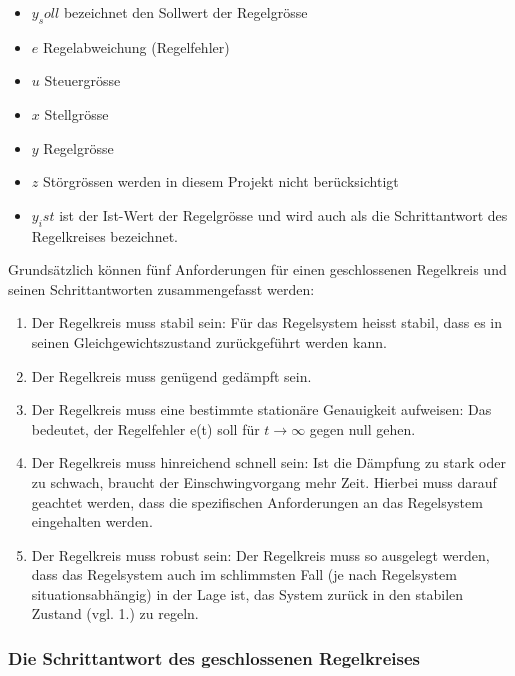 \begin{itemize}
    \item
        $y_soll$ bezeichnet den Sollwert der Regelgr\"osse
    \item
        $e$ Regelabweichung (Regelfehler)
    \item
        $u$ Steuergr\"osse
    \item
        $x$ Stellgr\"osse
    \item
        $y$ Regelgr\"osse
    \item
        $z$ St\"orgr\"ossen werden in diesem Projekt nicht ber\"ucksichtigt
    \item
        $y_ist$  ist der  Ist-Wert der  Regelgr\"osse  und wird  auch als  die
        Schrittantwort des Regelkreises bezeichnet.
\end{itemize}


Grunds\"atzlich  k\"onnen  f\"unf   Anforderungen  f\"ur  einen  geschlossenen
Regelkreis und seinen Schrittantworten zusammengefasst werden:
\begin{enumerate}
    \item
        Der Regelkreis muss stabil  sein: F\"ur das Regelsystem heisst stabil,
        dass es in seinen Gleichgewichtszustand zur\"uckgef\"uhrt werden kann.
    \item
        Der Regelkreis muss gen\"ugend ged\"ampft sein.
    \item
        Der   Regelkreis   muss   eine  bestimmte   station\"are   Genauigkeit
        aufweisen: Das   bedeutet,    der   Regelfehler   e(t)    soll   f\"ur
        $t\rightarrow\infty$ gegen null gehen.
    \item
        Der  Regelkreis  muss  hinreichend schnell  sein: Ist  die  D\"ampfung
        zu  stark   oder  zu  schwach,  braucht   der  Einschwingvorgang  mehr
        Zeit. Hierbei  muss  darauf  geachtet werden,  dass  die  spezifischen
        Anforderungen an das Regelsystem eingehalten werden.
    \item
        Der  Regelkreis muss  robust  sein: Der Regelkreis  muss so  ausgelegt
        werden,  dass  das  Regelsystem  auch im  schlimmsten  Fall  (je  nach
        Regelsystem situationsabh\"angig) in der Lage ist, das System zur\"uck
        in den stabilen Zustand (vgl. 1.) zu regeln.
\end{enumerate}


\subsubsection*{Die Schrittantwort des geschlossenen Regelkreises}

